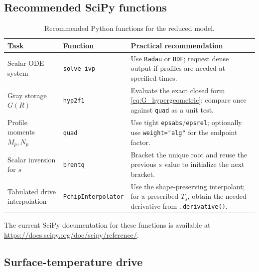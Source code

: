 \documentclass[11pt]{article}
\numberwithin{equation}{section}
\newcommand{\Ts}{T_s}
\begin{document}
\subsection{Recommended SciPy functions}

\begin{table}[H]
\centering
\caption{Recommended Python functions for the reduced model.}
\label{tab:scipy_functions}
\small
\begin{tabular}{>{\raggedright\arraybackslash}p{}
                >{\raggedright\arraybackslash}p{}
                >{\raggedright\arraybackslash}p{}}
\toprule
Task & Function & Practical recommendation \\
\midrule
Scalar ODE system & \texttt{solve\_ivp} &
Use \texttt{Radau} or \texttt{BDF}; request dense output if profiles are needed
at specified times. \\
Gray storage $G(R)$ & \texttt{hyp2f1} &
Evaluate the exact closed form \eqref{eq:G_hypergeometric}; compare once
against \texttt{quad} as a unit test. \\
Profile moments $M_p,N_p$ & \texttt{quad} &
Use tight \texttt{epsabs}/\texttt{epsrel}; optionally use
\texttt{weight="alg"} for the endpoint factor. \\
Scalar inversion for $s$ & \texttt{brentq} &
Bracket the unique root and reuse the previous $s$ value to initialize the next
bracket. \\
Tabulated drive interpolation & \texttt{PchipInterpolator} &
Use the shape-preserving interpolant; for a prescribed $\Ts$, obtain the
needed derivative from \texttt{.derivative()}. \\
\bottomrule
\end{tabular}
\end{table}
The current SciPy documentation for these functions is available at
\url{https://docs.scipy.org/doc/scipy/reference/}.

\subsection{Surface-temperature drive}
\end{document}
